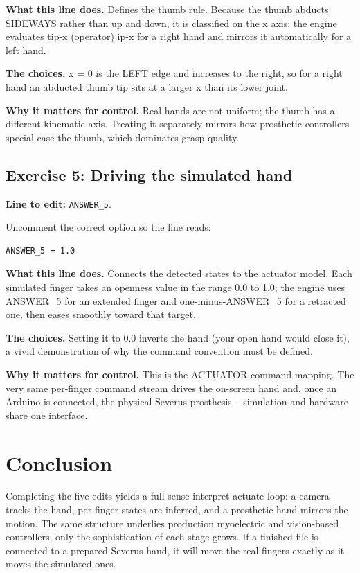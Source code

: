 \documentclass[conference]{IEEEtran}
\begin{document}
\textbf{What this line does.} Defines the thumb rule. Because the thumb abducts SIDEWAYS rather than up and down, it is classified on the x axis: the engine evaluates tip-x (operator) ip-x for a right hand and mirrors it automatically for a left hand.

\textbf{The choices.} x = 0 is the LEFT edge and increases to the right, so for a right hand an abducted thumb tip sits at a larger x than its lower joint.

\textbf{Why it matters for control.} Real hands are not uniform; the thumb has a different kinematic axis. Treating it separately mirrors how prosthetic controllers special-case the thumb, which dominates grasp quality.

\subsection{Exercise 5: Driving the simulated hand}

\textbf{Line to edit:} \lstinline!ANSWER_5!.

Uncomment the correct option so the line reads:

\begin{lstlisting}
ANSWER_5 = 1.0
\end{lstlisting}


\textbf{What this line does.} Connects the detected states to the actuator model. Each simulated finger takes an openness value in the range 0.0 to 1.0; the engine uses ANSWER\_5 for an extended finger and one-minus-ANSWER\_5 for a retracted one, then eases smoothly toward that target.

\textbf{The choices.} Setting it to 0.0 inverts the hand (your open hand would close it), a vivid demonstration of why the command convention must be defined.

\textbf{Why it matters for control.} This is the ACTUATOR command mapping. The very same per-finger command stream drives the on-screen hand and, once an Arduino is connected, the physical Severus prosthesis -- simulation and hardware share one interface.

\section{Conclusion}
Completing the five edits yields a full sense-interpret-actuate loop: a camera tracks the hand, per-finger states are inferred, and a prosthetic hand mirrors the motion. The same structure underlies production myoelectric and vision-based controllers; only the sophistication of each stage grows. If a finished file is connected to a prepared Severus hand, it will move the real fingers exactly as it moves the simulated ones.
\end{document}
